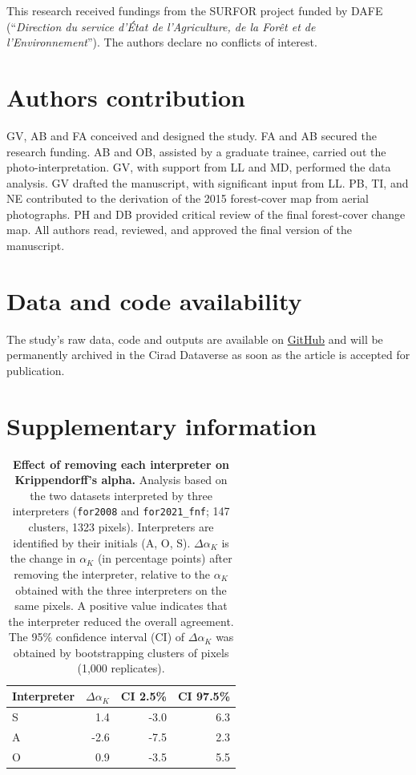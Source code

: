 \documentclass[paper=a4, fontsize=12pt, DIV=13, english, dvipsnames]{scrartcl}
\begin{document}
This research received fundings from the SURFOR project funded by DAFE (``\emph{Direction du service d’État de l’Agriculture, de la Forêt et de l'Environnement}''). The authors declare no conflicts of interest.
\section{Authors contribution}
\label{sec:orga07eac6}

GV, AB and FA conceived and designed the study. FA and AB secured the research funding. AB and OB, assisted by a graduate trainee, carried out the photo-interpretation. GV, with support from LL and MD, performed the data analysis. GV drafted the manuscript, with significant input from LL. PB, TI, and NE contributed to the derivation of the 2015 forest-cover map from aerial photographs. PH and DB provided critical review of the final forest-cover change map. All authors read, reviewed, and approved the final version of the manuscript.
\section{Data and code availability}
\label{sec:org65c2c74}

The study's raw data, code and outputs are available on \href{https://github.com/ghislainv/fcc-nc-surfor-v2}{GitHub} and will be permanently archived in the Cirad Dataverse as soon as the article is accepted for publication.
\section{Supplementary information}
\label{sec:orgf1ed016}

\renewcommand{\thetable}{S\arabic{table}}
\renewcommand{\theHtable}{S\arabic{table}}
\setcounter{table}{0}

\begin{table}[htbp]
\caption{\label{tab:orgcfc36d6}\textbf{Effect of removing each interpreter on Krippendorff's alpha.} Analysis based on the two datasets interpreted by three interpreters (\texttt{for2008} and \texttt{for2021\_fnf}; 147 clusters, 1323 pixels). Interpreters are identified by their initials (A, O, S). \(\Delta\alpha_{K}\) is the change in \(\alpha_{K}\) (in percentage points) after removing the interpreter, relative to the \(\alpha_{K}\) obtained with the three interpreters on the same pixels. A positive value indicates that the interpreter reduced the overall agreement. The 95\% confidence interval (CI) of \(\Delta\alpha_{K}\) was obtained by bootstrapping clusters of pixels (1,000 replicates).\label{tab:loo}\\
}
\centering
\small
\begin{tabular}{lrrr}
\toprule
Interpreter & \(\Delta\alpha_{K}\) & CI 2.5\% & CI 97.5\%\\
\midrule
S & 1.4 & -3.0 & 6.3\\
A & -2.6 & -7.5 & 2.3\\
O & 0.9 & -3.5 & 5.5\\
\bottomrule
\end{tabular}
\end{table}
\end{document}
